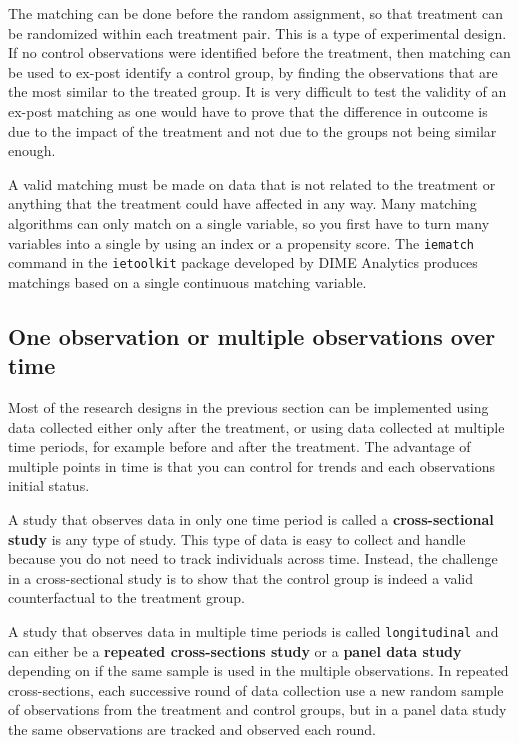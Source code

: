 The matching can be done before the random assignment, 
so that treatment can be randomized within each treatment pair. 
This is a type of experimental design. 
If no control observations were identified before the treatment, 
then matching can be used to ex-post identify a control group, 
by finding the observations that are the most similar to the treated group.
It is very difficult to test the validity of an ex-post matching 
as one would have to prove that the difference in outcome is 
due to the impact of the treatment and not due to the groups not being similar enough.

A valid matching must be made on data that is not related to the treatment 
or anything that the treatment could have affected in any way. 
Many matching algorithms can only match on a single variable, 
so you first have to turn many variables into a single by using an index or a propensity score.
The \texttt{iematch} command in the \texttt{ietoolkit} package developed by DIME Analytics 
produces matchings based on a single continuous matching variable.




\subsection{One observation or multiple observations over time}

Most of the research designs in the previous section can be implemented 
using data collected either only after the treatment, 
or using data collected at multiple time periods, 
for example before and after the treatment. 
The advantage of multiple points in time is 
that you can control for trends and each observations initial status.

A study that observes data in only one time period is called 
a \textbf{cross-sectional study} is any type of study. 
This type of data is easy to collect and handle because
you do not need to track individuals across time. 
Instead, the challenge in a cross-sectional study is to
show that the control group is indeed a valid counterfactual to the treatment group.

A study that observes data in multiple time periods is called \texttt{longitudinal} and
can either be a \textbf{repeated cross-sections study} or a \textbf{panel data study} 
depending on if the same sample is used in the multiple observations.
In repeated cross-sections, each successive round of data collection use a new random sample
of observations from the treatment and control groups, 
but in a panel data study the same observations are tracked and observed each round.


